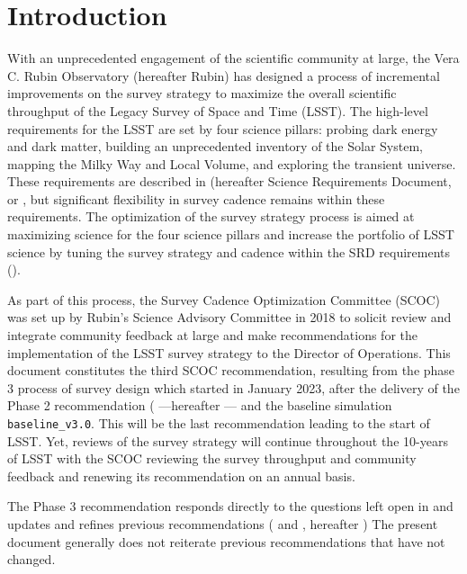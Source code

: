 \section{Introduction}

With an unprecedented engagement of the scientific community at large, the Vera C. Rubin Observatory (hereafter Rubin) has designed a process of incremental improvements on the survey strategy to maximize the overall scientific throughput of the Legacy Survey of Space and Time (LSST). The high-level requirements for the LSST are set by four science pillars: probing dark energy and dark matter, building an unprecedented inventory of the Solar System, mapping the Milky Way and Local Volume, and exploring the transient universe. These requirements are described in \cite{LPM-17} (hereafter Science Requirements Document, or , but significant flexibility in survey cadence remains within these requirements. The optimization of the survey strategy process is aimed at maximizing science for the four science pillars and increase the portfolio of LSST science by tuning the survey strategy and cadence within the SRD requirements ().

As part of this process, the Survey Cadence Optimization Committee (SCOC) was set up by Rubin's Science Advisory Committee in 2018 to solicit review and integrate community feedback at large and make recommendations for the implementation of the LSST survey strategy to the Director of Operations. This document constitutes the third SCOC recommendation, resulting from the phase 3 process of survey design which started in January 2023, after the delivery of the Phase 2 recommendation (\citealt{PSTN-055} ---hereafter --- and the baseline simulation \texttt{baseline\_v3.0}. This will be the last recommendation leading to the start of LSST. Yet, reviews of the survey strategy will continue throughout the 10-years of LSST with the SCOC reviewing the survey throughput and community feedback and renewing its recommendation on an annual basis. 

The Phase 3 recommendation responds directly to the questions left open in  and updates and refines previous recommendations ( and \cite{PSTN-053}, hereafter ) The present document generally does not reiterate previous recommendations that have not changed.


